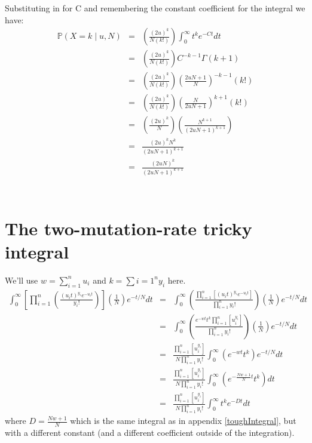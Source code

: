 \documentclass[11pt]{article}
\renewcommand{\Pr}{\mathbb{P}}
\begin{document}
Substituting in for C and remembering the constant coefficient for the integral we have:
\begin{eqnarray*}
\Pr(X=k \mid u, N) & = & \left(\frac{(2u)^k}{N(k!)}\right) \int_{0}^{\infty}  t^ke^{-C t} dt \\
 & = & \left(\frac{(2u)^k}{N(k!)}\right)C^{-k-1}\Gamma(k+1) \\
 & = & \left(\frac{(2u)^k}{N(k!)}\right)\left(\frac{2uN + 1}{N}\right)^{-k-1}\left(k!\right) \\
 & = & \left(\frac{(2u)^k}{N(k!)}\right)\left(\frac{N}{2uN + 1}\right)^{k+1}\left(k!\right) \\
 & = & \left(\frac{(2u)^k}{N}\right)\left(\frac{N^{k+1}}{(2uN + 1)^{k+1}}\right)\\
 & = & \frac{(2u)^k N^k}{(2uN + 1)^{k+1}} \\
 & = & \frac{(2uN)^k}{(2uN + 1)^{k+1}} \\
\end{eqnarray*}\



\section{The two-mutation-rate tricky integral}\label{messyTricky}
We'll use $w = \sum_{i=1}^{n} u_i$ and $k= \sum{i=1}^{n}y_i$ here.
\begin{eqnarray}
  \int_{0}^{\infty} \left[ \prod_{i=1}^{n}\left(\frac{(u_it)^{y_i} e^{-u_it}}{y_i!} \right)\right] \left(\frac{1}{N}\right) e^{-t/N}dt 
  & = & \int_{0}^{\infty} \left(\frac{\prod_{i=1}^{n}\left[(u_it)^{y_i}e^{-u_i t}\right]}{\prod_{i=1}^{n} y_i!}\right) \left(\frac{1}{N}\right) e^{-t/N} dt \\
    & = & \int_{0}^{\infty} \left(\frac{e^{-w t}t^{k}\prod_{i=1}^{n}\left[u_i^{y_i} \right]}{\prod_{i=1}^{n} y_i!}\right) \left(\frac{1}{N}\right) e^{-t/N} dt \\
    & = & \frac{\prod_{i=1}^{n}\left[u_i^{y_i}\right]}{N\prod_{i=1}^{n} y_i!}
    \int_{0}^{\infty} \left(e^{-w t}t^k\right) e^{-t/N} dt \\
    & = & \frac{\prod_{i=1}^{n}\left[u_i^{y_i}\right]}{N\prod_{i=1}^{n} y_i!}
    \int_{0}^{\infty} \left(e^{-\frac{Nw + 1}{N}t}t^k\right) dt \\
    & = & \frac{\prod_{i=1}^{n}\left[u_i^{y_i}\right]}{N\prod_{i=1}^{n} y_i!}
    \int_{0}^{\infty} t^k e^{-Dt} dt 
\end{eqnarray}
where $D= \frac{Nw + 1}{N}$
which is the same integral as in appendix \ref{toughIntegral}, but with a different constant (and a different 
coefficient outside of the integration).
\end{document}
